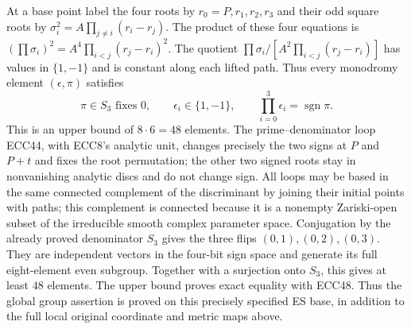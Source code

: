 \documentclass[11pt]{article}
\begin{document}
At a base point label the four roots by $r_0=P,r_1,r_2,r_3$ and their
odd square roots by $\sigma_i^2=A\prod_{j\ne i}(r_i-r_j)$. The product
of these four equations is
$(\prod\sigma_i)^2=A^4\prod_{i<j}(r_j-r_i)^2$. The quotient
$\prod\sigma_i/[A^2\prod_{i<j}(r_j-r_i)]$ has values in $\{1,-1\}$
and is constant along each lifted path. Thus every monodromy element
$(\epsilon,\pi)$ satisfies
\begin{equation}
 \pi\in S_3\text{ fixes }0,\qquad
 \epsilon_i\in\{1,-1\},\qquad
 \prod_{i=0}^3\epsilon_i=\operatorname{sgn}\pi.
 \tag{ECC48}
\end{equation}
This is an upper bound of $8\cdot6=48$ elements. The prime--denominator
loop ECC44, with ECC8's analytic unit, changes precisely the two signs
at $P$ and $P+t$ and fixes the root permutation; the other two signed
roots stay in nonvanishing analytic discs and do not change sign.
All loops may be based in the same connected complement of the
discriminant by joining their initial points with paths; this complement
is connected because it is a nonempty Zariski-open subset of the
irreducible smooth complex parameter space. Conjugation by the already
proved denominator $S_3$ gives the three flips $(0,1),(0,2),(0,3)$.
They are independent vectors in the four-bit sign space and generate
its full eight-element even subgroup. Together with a surjection onto
$S_3$, this gives at least $48$ elements. The upper bound proves exact
equality with ECC48. Thus the global group assertion is proved on this
precisely specified ES base, in addition to the full local original
coordinate and metric maps above.
\end{document}
